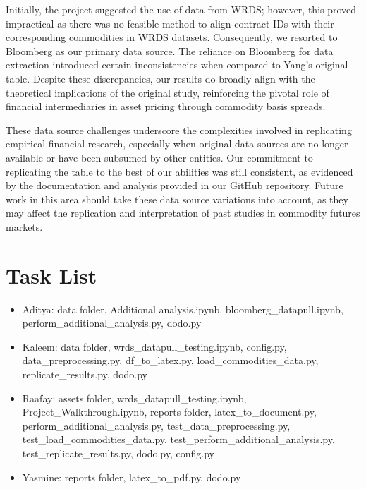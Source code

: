 \documentclass{article}
\begin{document}
Initially, the project suggested the use of data from WRDS; however, this proved impractical as there was no feasible method to align contract IDs with their corresponding commodities in WRDS datasets. Consequently, we resorted to Bloomberg as our primary data source. The reliance on Bloomberg for data extraction introduced certain inconsistencies when compared to Yang’s original table. Despite these discrepancies, our results do broadly align with the theoretical implications of the original study, reinforcing the pivotal role of financial intermediaries in asset pricing through commodity basis spreads.

These data source challenges underscore the complexities involved in replicating empirical financial research, especially when original data sources are no longer available or have been subsumed by other entities. Our commitment to replicating the table to the best of our abilities was still consistent, as evidenced by the documentation and analysis provided in our GitHub repository. Future work in this area should take these data source variations into account, as they may affect the replication and interpretation of past studies in commodity futures markets.

\section{Task List}

\begin{itemize}
    \item Aditya: data folder, Additional analysis.ipynb, bloomberg\_datapull.ipynb, perform\_additional\_analysis.py, dodo.py
    \item Kaleem: data folder, wrds\_datapull\_testing.ipynb, config.py, data\_preprocessing.py, df\_to\_latex.py, load\_commodities\_data.py, replicate\_results.py, dodo.py
    \item Raafay: assets folder, wrds\_datapull\_testing.ipynb, Project\_Walkthrough.ipynb, reports folder, latex\_to\_document.py, perform\_additional\_analysis.py, test\_data\_preprocessing.py, test\_load\_commodities\_data.py, test\_perform\_additional\_analysis.py, test\_replicate\_results.py, dodo.py, config.py
    \item Yasmine: reports folder, latex\_to\_pdf.py, dodo.py
\end{itemize}
\end{document}
